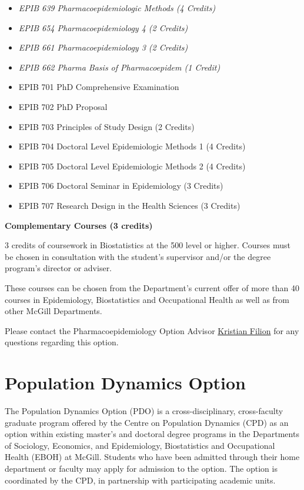 \documentclass[
  letterpaper,
  DIV=11,
  numbers=noendperiod]{scrreprt}
\providecommand{\tightlist}{%
  \setlength{\itemsep}{0pt}\setlength{\parskip}{0pt}}
\begin{document}
\begin{itemize}
\tightlist
\item
  \emph{EPIB 639 Pharmacoepidemiologic Methods (4 Credits)}
\item
  \emph{EPIB 654 Pharmacoepidemiology 4 (2 Credits)}
\item
  \emph{EPIB 661 Pharmacoepidemiology 3 (2 Credits)}
\item
  \emph{EPIB 662 Pharma Basis of Pharmacoepidem (1 Credit)}
\item
  EPIB 701 PhD Comprehensive Examination
\item
  EPIB 702 PhD Proposal
\item
  EPIB 703 Principles of Study Design (2 Credits)
\item
  EPIB 704 Doctoral Level Epidemiologic Methods 1 (4 Credits)
\item
  EPIB 705 Doctoral Level Epidemiologic Methods 2 (4 Credits)
\item
  EPIB 706 Doctoral Seminar in Epidemiology (3 Credits)
\item
  EPIB 707 Research Design in the Health Sciences (3 Credits)
\end{itemize}

\textbf{Complementary Courses (3 credits)}

3 credits of coursework in Biostatistics at the 500 level or higher.
Courses must be chosen in consultation with the student's supervisor
and/or the degree program's director or adviser.

These courses can be chosen from the Department's current offer of more
than 40 courses in Epidemiology, Biostatistics and Occupational Health
as well as from other McGill Departments.

Please contact the Pharmacoepidemiology Option Advisor
\href{mailto:kristian.filion@mcgill.ca}{Kristian Filion} for any
questions regarding this option.

\section{Population Dynamics Option}\label{population-dynamics-option}

The Population Dynamics Option (PDO) is a cross-disciplinary,
cross-faculty graduate program offered by the Centre on Population
Dynamics (CPD) as an option within existing master's and doctoral degree
programs in the Departments of Sociology, Economics, and Epidemiology,
Biostatistics and Occupational Health (EBOH) at McGill. Students who
have been admitted through their home department or faculty may apply
for admission to the option. The option is coordinated by the CPD, in
partnership with participating academic units.
\end{document}
